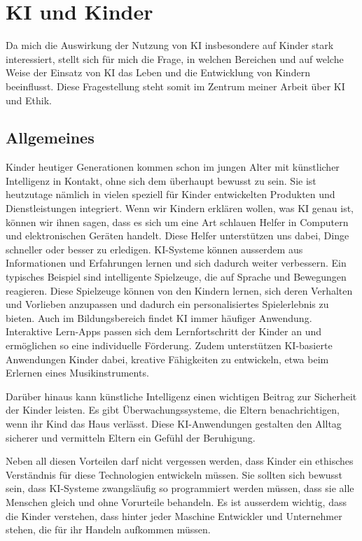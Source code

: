 \documentclass{report}
\begin{document}
\chapter{KI und Kinder}

Da mich die Auswirkung der Nutzung von KI insbesondere auf Kinder stark interessiert, stellt sich für mich die Frage, in welchen Bereichen und auf welche Weise der Einsatz von KI das Leben und die Entwicklung von Kindern beeinflusst. Diese Fragestellung steht somit im Zentrum meiner Arbeit über KI und Ethik.

\section{Allgemeines}

Kinder heutiger Generationen kommen schon im jungen Alter mit künstlicher Intelligenz in Kontakt, ohne sich dem überhaupt bewusst zu sein. Sie ist heutzutage nämlich in vielen speziell für Kinder entwickelten Produkten und Dienstleistungen integriert. Wenn wir Kindern erklären wollen, was KI genau ist, können wir ihnen sagen, dass es sich um eine Art schlauen Helfer in Computern und elektronischen Geräten handelt. Diese Helfer unterstützen uns dabei, Dinge schneller oder besser zu erledigen. KI-Systeme können ausserdem aus Informationen und Erfahrungen lernen und sich dadurch weiter verbessern.
Ein typisches Beispiel sind intelligente Spielzeuge, die auf Sprache und Bewegungen reagieren. Diese Spielzeuge können von den Kindern lernen, sich deren Verhalten und Vorlieben anzupassen und dadurch ein personalisiertes Spielerlebnis zu bieten.
Auch im Bildungsbereich findet KI immer häufiger Anwendung. Interaktive Lern-Apps passen sich dem Lernfortschritt der Kinder an und ermöglichen so eine individuelle Förderung. Zudem unterstützen KI-basierte Anwendungen Kinder dabei, kreative Fähigkeiten zu entwickeln, etwa beim Erlernen eines Musikinstruments.

Darüber hinaus kann künstliche Intelligenz einen wichtigen Beitrag zur Sicherheit der Kinder leisten. Es gibt Überwachungssysteme, die Eltern benachrichtigen, wenn ihr Kind das Haus verlässt. Diese KI-Anwendungen gestalten den Alltag sicherer und vermitteln Eltern ein Gefühl der Beruhigung. 

Neben all diesen Vorteilen darf nicht vergessen werden, dass Kinder ein ethisches Verständnis für diese Technologien entwickeln müssen. Sie sollten sich bewusst sein, dass KI-Systeme zwangsläufig so programmiert werden müssen, dass sie alle Menschen gleich und ohne Vorurteile behandeln. Es ist ausserdem wichtig, dass die Kinder verstehen, dass hinter jeder Maschine Entwickler und Unternehmer stehen, die für ihr Handeln aufkommen müssen.
\end{document}
